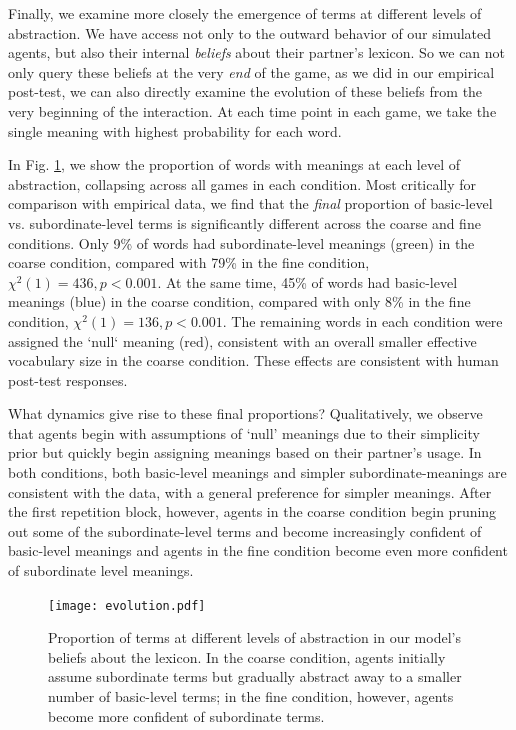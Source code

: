 Finally, we examine more closely the emergence of terms at different levels of abstraction.
We have access not only to the outward behavior of our simulated agents, but also their internal \emph{beliefs} about their partner's lexicon.
So we can not only query these beliefs at the very \emph{end} of the game, as we did in our empirical post-test, we can also directly examine the evolution of these beliefs from the very beginning of the interaction.
At each time point in each game, we take the single meaning with highest probability for each word.

In Fig. \ref{fig:evolution}, we show the proportion of words with meanings at each level of abstraction, collapsing across all games in each condition.
Most critically for comparison with empirical data, we find that the \emph{final} proportion of basic-level vs. subordinate-level terms is significantly different across the coarse and fine conditions.
Only 9\% of words had subordinate-level meanings (green) in the coarse condition, compared with 79\% in the fine condition, $\chi^2(1) = 436, p < 0.001$.
At the same time, 45\% of words had basic-level meanings (blue) in the coarse condition, compared with only 8\% in the fine condition, $\chi^2(1) = 136, p < 0.001$.
The remaining words in each condition were assigned the `null` meaning (red), consistent with an overall smaller effective vocabulary size in the coarse condition.
These effects are consistent with human post-test responses.

What dynamics give rise to these final proportions?
Qualitatively, we observe that agents begin with assumptions of `null' meanings due to their simplicity prior but quickly begin assigning meanings based on their partner's usage.
In both conditions, both basic-level meanings and simpler subordinate-meanings are consistent with the data, with a general preference for simpler meanings.
After the first repetition block, however, agents in the coarse condition begin pruning out some of the subordinate-level terms and become increasingly confident of basic-level meanings and agents in the fine condition become even more confident of subordinate level meanings. 

\begin{figure}[t]
\begin{center}
\texttt{[image: evolution.pdf]}
\caption{Proportion of terms at different levels of abstraction in our model's beliefs about the lexicon. In the coarse condition, agents initially assume subordinate terms but gradually abstract away to a smaller number of basic-level terms; in the fine condition, however, agents become more confident of subordinate terms.}
\label{fig:evolution}
\end{center}
\end{figure}


